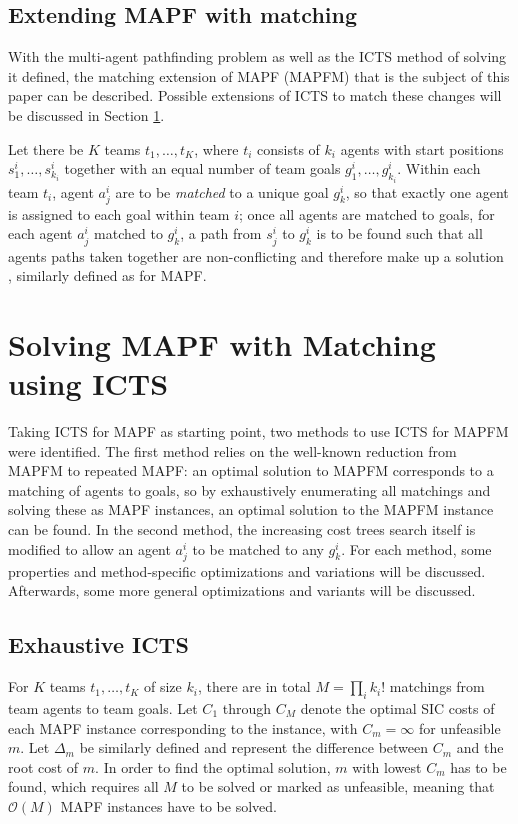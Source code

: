 \documentclass[english]{article}
\begin{document}
	\subsection{Extending MAPF with matching}
	With the multi-agent pathfinding problem as well as the ICTS method of solving it defined, the matching extension of MAPF (MAPFM) that is the subject of this paper can be described. Possible extensions of ICTS to match these changes will be discussed in Section \ref{section:icts-matching}.
	
	Let there be $K$ teams $t_1,\ldots, t_K$, where $t_i$ consists of $k_i$ agents with start positions $s_1^i,\ldots,s_{k_i}^i$ together with an equal number of team goals $g_1^i,\ldots,g_{k_i}^i$. Within each team $t_i$, agent $a_j^i$ are to be \textit{matched} to a unique goal $g_k^i$, so that exactly one agent is assigned to each goal within team $i$; once all agents are matched to goals, for each agent $a_j^i$ matched to $g_k^i$, a path from $s_j^i$ to $g_k^i$ is to be found such that all agents paths taken together are non-conflicting and therefore make up a solution \cite{ma2016}, similarly defined as for MAPF.
	
	
	\section{Solving MAPF with Matching using ICTS} %
	\label{section:icts-matching}
	Taking ICTS for MAPF as starting point, two methods to use ICTS for MAPFM were identified. The first method relies on the well-known reduction from MAPFM to repeated MAPF: an optimal solution to MAPFM corresponds to a matching of agents to goals, so by exhaustively enumerating all matchings and solving these as MAPF instances, an optimal solution to the MAPFM instance can be found. In the second method, the increasing cost trees search itself is modified to allow an agent $a_j^i$ to be matched to any $g_k^i$. For each method, some properties and method-specific optimizations and variations will be discussed. Afterwards, some more general optimizations and variants will be discussed.
	\subsection{Exhaustive ICTS}
	For $K$ teams $t_1,\ldots,t_K$ of size $k_i$, there are in total $M = \prod_{i} k_i!$ matchings from team agents to team goals. Let $C_1$ through $C_M$ denote the optimal SIC costs of each MAPF instance corresponding to the instance, with $C_m = \infty$ for unfeasible $m$. Let $\Delta_m$ be similarly defined and represent the difference between $C_m$ and the root cost of $m$. In order to find the optimal solution, $m$ with lowest $C_m$ has to be found, which requires all $M$ to be solved or marked as unfeasible, meaning that $\mathcal{O}(M)$ MAPF instances have to be solved. 
\end{document}
